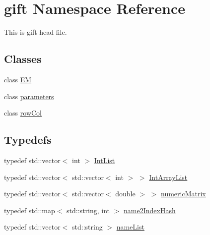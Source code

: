 \hypertarget{namespacegift}{}\section{gift Namespace Reference}
\label{namespacegift}


This is gift head file.  


\subsection*{Classes}
\begin{DoxyCompactItemize}
\item 
class \hyperlink{classgift_1_1_e_m}{EM}
\item 
class \hyperlink{classgift_1_1parameters}{parameters}
\item 
class \hyperlink{classgift_1_1row_col}{row\+Col}
\end{DoxyCompactItemize}
\subsection*{Typedefs}
\begin{DoxyCompactItemize}
\item 
typedef std\+::vector$<$ int $>$ \hyperlink{namespacegift_a786390fe70b2e3b6d61dba1014651f03}{Int\+List}
\item 
typedef std\+::vector$<$ std\+::vector$<$ int $>$ $>$ \hyperlink{namespacegift_a98b589c33d80e413fceaf8afd8e25815}{Int\+Array\+List}
\item 
typedef std\+::vector$<$ std\+::vector$<$ double $>$ $>$ \hyperlink{namespacegift_a4e11987023733fe14bdabd0b52e78583}{numeric\+Matrix}
\item 
typedef std\+::map$<$ std\+::string, int $>$ \hyperlink{namespacegift_a88a96011620ed18b8321bc36a816773c}{name2\+Index\+Hash}
\item 
typedef std\+::vector$<$ std\+::string $>$ \hyperlink{namespacegift_a62f85efaab3bff48335863ae0670c7a7}{name\+List}
\end{DoxyCompactItemize}
